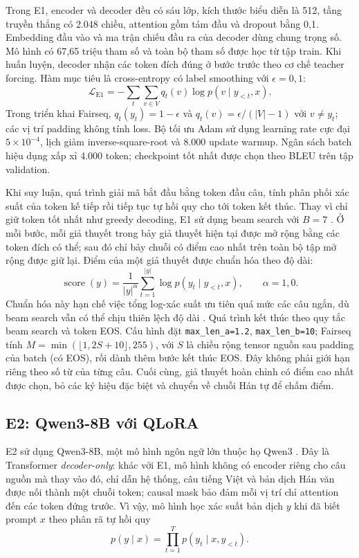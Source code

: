 \documentclass[11pt,twocolumn]{article}
\begin{document}
Trong E1, encoder và decoder đều có sáu lớp, kích thước biểu diễn là 512, tầng
truyền thẳng có 2.048 chiều, attention gồm tám đầu và dropout bằng 0,1.
Embedding đầu vào và ma trận chiếu đầu ra của decoder dùng chung trọng số. Mô
hình có 67,65 triệu tham số và toàn bộ tham số được học từ tập train. Khi huấn
luyện, decoder nhận các token đích đúng ở bước trước theo cơ chế teacher
forcing. Hàm mục tiêu là cross-entropy có label smoothing với
$\epsilon=0{,}1$:
\begin{equation}
\mathcal{L}_{\mathrm{E1}}=-\sum_t\sum_{v\in V}
q_t(v)\log p(v\mid y_{<t},x).
\end{equation}
Trong triển khai Fairseq, $q_t(y_t)=1-\epsilon$ và
$q_t(v)=\epsilon/(|V|-1)$ với $v\ne y_t$; các vị trí padding không tính loss.
Bộ tối ưu Adam sử dụng learning rate cực đại $5\times10^{-4}$, lịch giảm
inverse-square-root và 8.000 update warmup. Ngân sách batch hiệu dụng xấp xỉ
4.000 token; checkpoint tốt nhất được chọn theo BLEU trên tập validation.

Khi suy luận, quá trình giải mã
bắt đầu bằng token đầu câu, tính phân phối xác suất của token kế tiếp rồi tiếp
tục tự hồi quy cho tới token kết thúc. Thay vì chỉ giữ token tốt nhất như greedy decoding, E1 sử dụng beam search với $B=7$ \citep{freitag2017beam}. Ở mỗi bước,
mỗi giả thuyết trong bảy giả thuyết hiện tại được mở rộng bằng các token đích
có thể; sau đó chỉ bảy chuỗi có điểm cao nhất trên toàn bộ tập mở rộng được giữ
lại. Điểm của một giả thuyết được chuẩn hóa theo độ dài:
\begin{equation}
\operatorname{score}(y)=\frac{1}{|y|^{\alpha}}
\sum_{t=1}^{|y|}\log p(y_t\mid y_{<t},x),
\qquad \alpha=1{,}0.
\end{equation}
Chuẩn hóa này hạn chế việc tổng log-xác suất ưu tiên quá mức các câu ngắn, dù
beam search vẫn có thể chịu thiên lệch độ dài \citep{murray2018length}. Quá
trình kết thúc theo quy tắc beam search và token EOS. Cấu hình đặt
\texttt{max\_len\_a=1.2}, \texttt{max\_len\_b=10}; Fairseq tính
$M=\min(\lfloor1{,}2S+10\rfloor,255)$, với $S$ là chiều rộng tensor nguồn
sau padding của batch (có EOS), rồi dành thêm bước kết thúc EOS.
Đây không phải giới hạn riêng theo số từ của từng câu. Cuối cùng, giả thuyết hoàn chỉnh có điểm cao nhất được
chọn, bỏ các ký hiệu đặc biệt và chuyển về chuỗi Hán tự để chấm điểm.

\subsection{E2: Qwen3-8B với QLoRA}
E2 sử dụng Qwen3-8B, một mô hình ngôn ngữ lớn thuộc họ Qwen3
\citep{qwen3technicalreport}. Đây là Transformer \emph{decoder-only}: khác với
E1, mô hình không có encoder riêng cho câu nguồn mà thay vào đó, chỉ dẫn hệ thống, câu tiếng
Việt và bản dịch Hán văn được nối thành một chuỗi token; causal mask bảo đảm
mỗi vị trí chỉ attention đến các token đứng trước. Vì vậy, mô hình học xác suất
bản dịch $y$ khi đã biết prompt $x$ theo phân rã tự hồi quy
\begin{equation}
p(y\mid x)=\prod_{t=1}^{T}p(y_t\mid x,y_{<t}).
\end{equation}
\end{document}
